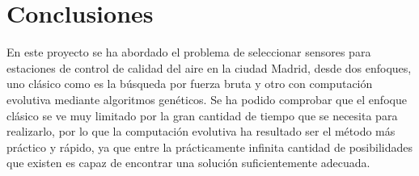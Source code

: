 \documentclass[12pt, spanish, pdftex]{UC3M_document}
\begin{document}
\section{Conclusiones}
En este proyecto se ha abordado el problema de seleccionar sensores para estaciones de control de calidad del aire en la ciudad Madrid, desde dos enfoques, uno clásico como es la búsqueda por fuerza bruta y otro con computación evolutiva mediante algoritmos genéticos. Se ha podido comprobar que el enfoque clásico se ve muy limitado por la gran cantidad de tiempo que se necesita para realizarlo, por lo que la computación evolutiva ha resultado ser el método más práctico y rápido, ya que entre la prácticamente infinita cantidad de posibilidades que existen es capaz de encontrar una solución suficientemente adecuada.
\end{document}
